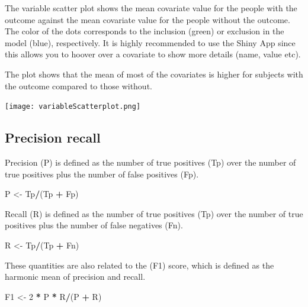 \documentclass[]{article}
\newenvironment{Shaded}{\begin{snugshade}}{\end{snugshade}}
\newcommand{\DecValTok}[1]{\textcolor[rgb]{0.00,0.00,0.81}{#1}}
\newcommand{\StringTok}[1]{\textcolor[rgb]{0.31,0.60,0.02}{#1}}
\newcommand{\OperatorTok}[1]{\textcolor[rgb]{0.81,0.36,0.00}{\textbf{#1}}}
\newcommand{\NormalTok}[1]{#1}
\begin{document}
The variable scatter plot shows the mean covariate value for the people
with the outcome against the mean covariate value for the people without
the outcome. The color of the dots corresponds to the inclusion (green)
or exclusion in the model (blue), respectively. It is highly recommended
to use the Shiny App since this allows you to hoover over a covariate to
show more details (name, value etc).

The plot shows that the mean of most of the covariates is higher for
subjects with the outcome compared to those without.

\texttt{[image: variableScatterplot.png]}

\newpage

\subsection{Precision recall}\label{precision-recall}

Precision (P) is defined as the number of true positives (Tp) over the
number of true positives plus the number of false positives (Fp).

\begin{Shaded}
\begin{Highlighting}[]
\NormalTok{P <-}\StringTok{ }\NormalTok{Tp}\OperatorTok{/}\NormalTok{(Tp }\OperatorTok{+}\StringTok{ }\NormalTok{Fp)}
\end{Highlighting}
\end{Shaded}

Recall (R) is defined as the number of true positives (Tp) over the
number of true positives plus the number of false negatives (Fn).

\begin{Shaded}
\begin{Highlighting}[]
\NormalTok{R <-}\StringTok{ }\NormalTok{Tp}\OperatorTok{/}\NormalTok{(Tp }\OperatorTok{+}\StringTok{ }\NormalTok{Fn)}
\end{Highlighting}
\end{Shaded}

These quantities are also related to the (F1) score, which is defined as
the harmonic mean of precision and recall.

\begin{Shaded}
\begin{Highlighting}[]
\NormalTok{F1 <-}\StringTok{ }\DecValTok{2} \OperatorTok{*}\StringTok{ }\NormalTok{P }\OperatorTok{*}\StringTok{ }\NormalTok{R}\OperatorTok{/}\NormalTok{(P }\OperatorTok{+}\StringTok{ }\NormalTok{R)}
\end{Highlighting}
\end{Shaded}
\end{document}
